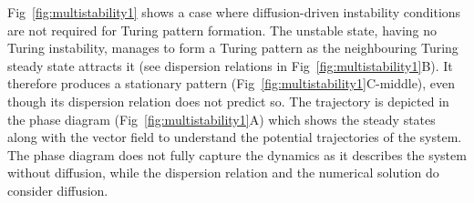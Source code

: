 \documentclass[10pt,letterpaper]{article}
\begin{document}
Fig~\ref{fig:multistability1} shows a case where diffusion-driven instability conditions are not required for Turing pattern formation.
The unstable state, having no Turing instability, manages to form a Turing pattern as the neighbouring Turing steady state attracts it (see dispersion relations in Fig~\ref{fig:multistability1}B).
It therefore produces a stationary pattern (Fig~\ref{fig:multistability1}C-middle), even though its dispersion relation does not predict so.
The trajectory is depicted in the phase diagram (Fig~\ref{fig:multistability1}A) which shows the steady states along with the vector field to understand the potential trajectories of the system.
The phase diagram does not fully capture the dynamics as it describes the system without diffusion, while the dispersion relation and the numerical solution do consider diffusion.
\end{document}
